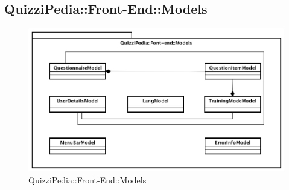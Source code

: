 \newpage

\subsection{QuizziPedia::Front-End::Models}

	\label{QuizziPedia::Front-End::Models}
	
	\begin{figure}[ht]
		\centering
		\includegraphics[scale=0.5,keepaspectratio]{UML/Package/QuizziPedia_Front-End_Models.png}
		\caption{QuizziPedia::Front-End::Models}
	\end{figure} \FloatBarrier

